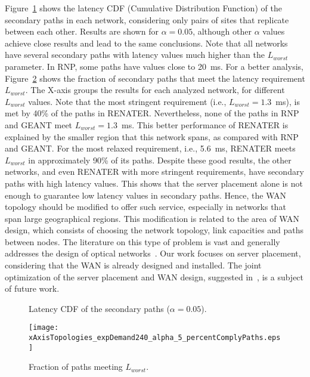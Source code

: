 \documentclass[preprint]{elsarticle}
\begin{document}
Figure~\ref{zeroRPOfig:redudantPaths} shows the latency CDF (Cumulative Distribution Function) of the secondary paths in each network, considering only pairs of sites that replicate between each other. Results are shown for $\alpha = 0.05$, although other $\alpha$ values achieve close results and lead to the same conclusions. Note that all networks have several secondary paths with latency values much higher than the $L_{worst}$ parameter. In RNP, some paths have values close to 20~ms. For a better analysis, Figure~\ref{zeroRPOfig:percentComplyPaths} shows the fraction of secondary paths that meet the latency requirement $L_{worst}$. The X-axis groups the results for each analyzed network, for different $L_{worst}$ values. Note that the most stringent requirement (i.e., $L_{worst}=1.3$~ms), is met by 40\% of the paths in RENATER. Nevertheless, none of the paths in RNP and GEANT meet $L_{worst}=1.3$~ms. This better performance of RENATER is explained by the smaller region that this network spans, as compared with RNP and GEANT. For the most relaxed requirement, i.e., 5.6~ms, RENATER meets $L_{worst}$ in approximately 90\% of its paths. Despite these good results, the other networks, and even RENATER with more stringent requirements, have secondary paths with high latency values. This shows that the server placement alone is not enough to guarantee low latency values in secondary paths. Hence, the WAN topology should be modified to offer such service, especially in networks that span large geographical regions. This modification is related to the area of WAN design, which consists of choosing the network topology, link capacities and paths between nodes.
The literature on this type of problem is vast and generally addresses the design of optical networks~\cite{habib2013disaster}.
Our work focuses on server placement, considering that the WAN is already designed and installed. The joint optimization of the server placement and WAN design, suggested in~\cite{couto2014Network}, is a subject of future work.
\begin{figure}[ht!]
\centering
{}
\caption{Latency CDF of the secondary paths ($\alpha = 0.05$).}
\label{zeroRPOfig:redudantPaths}
\end{figure}
\begin{figure}[ht!]
\centering
\texttt{[image: xAxisTopologies\_expDemand240\_alpha\_5\_percentComplyPaths.eps]}
\caption{Fraction of paths meeting $L_{worst}$.}
\label{zeroRPOfig:percentComplyPaths}
\end{figure} 
\end{document}
